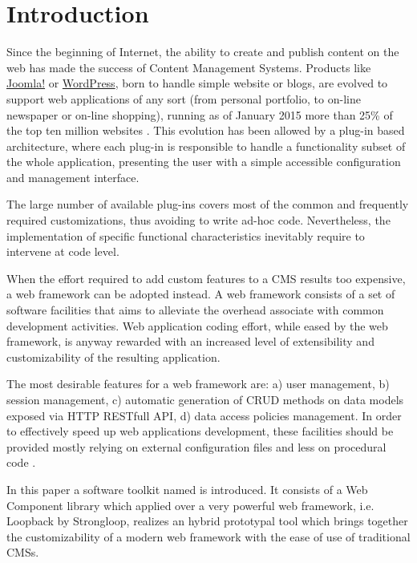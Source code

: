 \section{Introduction}\label{sec:introduction}

Since the beginning of Internet, the ability to create and publish content on the web has made the success of Content Management Systems. Products like \href{http://www.joomla.org/}{Joomla!} or \href{https://wordpress.org/}{WordPress}, born to handle simple website or blogs, are evolved to support web applications of any sort (from personal portfolio, to on-line newspaper or on-line shopping), running as of January 2015 more than 25\% of the top ten million websites \cite{usage-cms}. This evolution has been allowed by a plug-in based architecture, where each plug-in is responsible to handle a functionality subset of the whole application, presenting the user with a simple accessible configuration and management interface.

The large number of available plug-ins covers most of the common and frequently required customizations, thus avoiding to write ad-hoc code. Nevertheless, the implementation of specific functional characteristics inevitably require to intervene at code level.

When the effort required to add custom features to a CMS results too expensive, a web framework can be adopted instead. A web framework consists of a set of software facilities that aims to alleviate the overhead associate with common development activities. Web application coding effort, while eased by the web framework, is anyway rewarded with an increased level of extensibility and customizability of the resulting application.

The most desirable features for a web framework are: a) user management, b) session management, c) automatic generation of CRUD methods on data models exposed via HTTP RESTfull API, d) data access policies management. In order to effectively speed up web applications development, these facilities should be provided mostly relying on external configuration files and less on procedural code \cite{6859693}.

In this paper a software toolkit named  is introduced. It consists of a Web Component library which applied over a very powerful web framework, i.e. Loopback by Strongloop, realizes an hybrid prototypal tool which brings together the customizability of a modern web framework with the ease of use of traditional CMSs.

